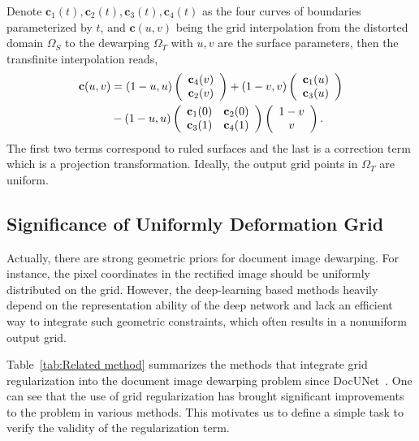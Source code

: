 \documentclass[10pt,twocolumn,letterpaper]{article}
\begin{document}
Denote $\mathbf{c}_{1}(t),\mathbf{c}_{2}(t),\mathbf{c}_{3}(t),\mathbf{c}_{4}(t)$ as the four curves of boundaries parameterized by $t$, 
and $\mathbf{c}(u,v)$ being the grid interpolation from the distorted domain $\Omega_S$ to the dewarping $\Omega_T$ with $u,v$ are the surface parameters, then the transfinite interpolation reads,
\begin{equation}
\begin{aligned}
\small \mathbf{c}(u, v) & =(1-u, u)
    \left(\begin{array}{l}\mathbf{c}_{4}(v) \\
    \mathbf{c}_{2}(v)\end{array}\right)
    +\left(1-v, v\right)
    \left(
    \begin{array}{l}\mathbf{c}_{1}(u) \\
    \mathbf{c}_{3}(u)\end{array}\right) \\
    &-\left(1-u, u\right)\left(\begin{array}{ll}
    \mathbf{c}_{1}(0) & \mathbf{c}_{2}(0) \\
    \mathbf{c}_{3}(1) & \mathbf{c}_{4}(1)
    \end{array}
    \right)
    \left(\begin{array}{c}
    1-v\\ v \end{array}\right).
\label{eq:tfi}
\end{aligned}
\end{equation}
The first two terms correspond to ruled surfaces and the last is a correction term which is a projection transformation. 
Ideally, the output grid points in $\Omega_T$ are uniform.


\subsection{Significance of Uniformly Deformation Grid}

Actually, there are strong geometric priors for document image dewarping. For instance, the pixel coordinates in the rectified image should be uniformly distributed on the grid. However, the deep-learning based methods heavily depend on the representation ability of the deep network and lack an efficient way to integrate such geometric constraints, which often results in a nonuniform output grid. 

Table~\ref{tab:Related method} summarizes the methods that integrate grid regularization into the document image dewarping problem since DocUNet~\cite{Ma_2018_CVPR}. One can see that the use of grid regularization has brought significant improvements to the problem in various methods. This motivates us to define a simple task to verify the validity of the regularization term. 
\end{document}
